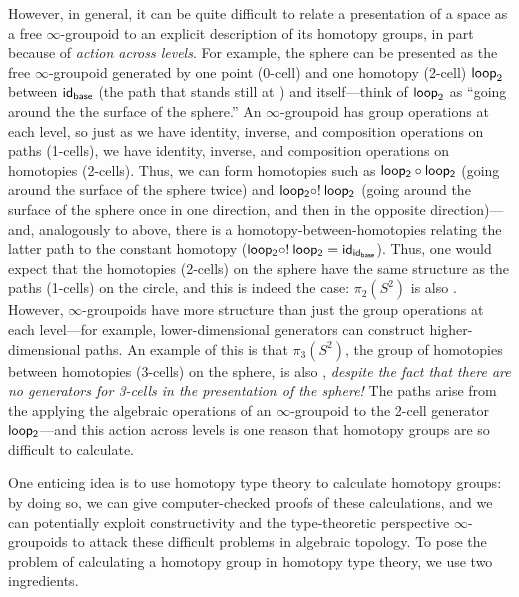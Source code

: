 However, in general, it can be quite difficult to relate a presentation
of a space as a free $\infty$-groupoid to an explicit description of its
homotopy groups, in part because of \emph{action across levels}.  For
example, the sphere can be presented as the free $\infty$-groupoid generated by
one point (0-cell)  and one homotopy (2-cell) $\mathsf{loop}_2$
between $\mathsf{id}_{{\mathsf{base}}}$ (the path that stands still at
) and itself---think of $\mathsf{loop}_2$ as ``going around the
the surface of the sphere.''  An $\infty$-groupoid has group operations
at each level, so just as we have identity, inverse, and composition
operations on paths (1-cells), we have identity, inverse, and
composition operations on homotopies (2-cells).  Thus, we can form
homotopies such as $\mathsf{loop_2} \mathbin{\circ} \mathsf{loop_2}$ (going around the
surface of the sphere twice) and $\mathsf{loop_2} \mathbin{\circ} ! \: \mathsf{loop_2}$
(going around the surface of the sphere once in one direction, and then
in the opposite direction)---and, analogously to above, there is a
homotopy-between-homotopies relating the latter path to the constant
homotopy ($\mathsf{loop_2} \mathbin{\circ} ! \: \mathsf{loop_2} =
\mathsf{id}_{{\mathsf{id}_{\mathsf{base}}}}$).  Thus, one would expect that the
homotopies (2-cells) on the sphere have the same structure as the paths
(1-cells) on the circle, and this is indeed the case: $\pi_2(S^2)$ is
also \Z.  However, $\infty$-groupoids have more structure than just the
group operations at each level---for example, lower-dimensional
generators can construct higher-dimensional paths.  An example of this
is that $\pi_3(S^2)$, the group of homotopies between homotopies
(3-cells) on the sphere, is also \Z, \emph{despite the fact that there
  are no generators for 3-cells in the presentation of the sphere!}  The
paths arise from the applying the algebraic operations of an
$\infty$-groupoid to the 2-cell generator $\mathsf{loop_2}$---and this
action across levels is one reason that homotopy groups are so difficult
to calculate.  

One enticing idea is to use homotopy type theory to calculate homotopy
groups: by doing so, we can give computer-checked proofs of these
calculations, and we can potentially exploit constructivity and the
type-theoretic perspective $\infty$-groupoids to attack these difficult
problems in algebraic topology.  To pose the problem of calculating a
homotopy group in homotopy type theory, we use two ingredients.  

